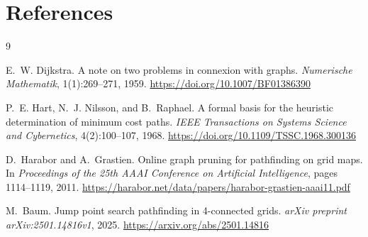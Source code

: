 \documentclass[11pt,a4paper]{article}
\begin{document}
\FloatBarrier

\section*{References}

\begin{thebibliography}{9}

E.~W. Dijkstra.
\newblock A note on two problems in connexion with graphs.
\newblock \emph{Numerische Mathematik}, 1(1):269--271, 1959.
\newblock \url{https://doi.org/10.1007/BF01386390}

P.~E. Hart, N.~J. Nilsson, and B.~Raphael.
\newblock A formal basis for the heuristic determination of minimum cost paths.
\newblock \emph{IEEE Transactions on Systems Science and Cybernetics}, 4(2):100--107, 1968.
\newblock \url{https://doi.org/10.1109/TSSC.1968.300136}

D.~Harabor and A.~Grastien.
\newblock Online graph pruning for pathfinding on grid maps.
\newblock In \emph{Proceedings of the 25th AAAI Conference on Artificial Intelligence}, pages 1114--1119, 2011.
\newblock \url{https://harabor.net/data/papers/harabor-grastien-aaai11.pdf}

M.~Baum.
\newblock Jump point search pathfinding in 4-connected grids.
\newblock \emph{arXiv preprint arXiv:2501.14816v1}, 2025.
\newblock \url{https://arxiv.org/abs/2501.14816}

\end{thebibliography}
\end{document}
